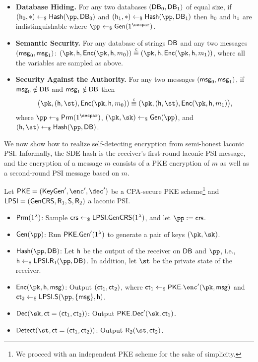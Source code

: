 \begin{definition}
\begin{itemize}
\item \textbf{Database Hiding.} For any two databases $({\mathsf{DB}}_0, {\mathsf{DB}}_1)$ of equal size, if $(\hsh_0, *) \pick \Hash(\pp, \DB_0)$ and $(\hsh_1, *) \pick \Hash(\pp, \DB_1)$ then ${\mathsf{h}}_0$ and ${\mathsf{h}}_1$ are indistinguishable where $\pp \pick \Gen(1^{\secpar})$.

\item \textbf{Semantic Security.} 
For any database of strings ${\mathsf{DB}}$ and any two messages $(\mathsf{msg}_0, \mathsf{msg}_1)$: $(\pk, \hsh, \Enc(\pk, \hsh, m_0)) \comp  (\pk, \hsh, \Enc(\pk, \hsh, m_1))$, where all the variables are sampled as above.

	
\item \textbf{Security Against the Authority.} For any two messages $(\mathsf{msg}_0, \mathsf{msg}_1)$, if $\mathsf{msg}_0 \notin {\mathsf{DB}}$ and $\mathsf{msg}_1 \notin {\mathsf{DB}}$ then  
\[\big(\pk, (\hsh, \st), \Enc(\pk, \hsh, m_0)) \comp  (\pk, (\hsh, \st), \Enc(\pk, \hsh, m_1)\big),\]
where $\pp \pick \Glo(1^\secpar)$, $(\pk, \sk) \pick \Gen(\pp)$, and $(\hsh, \st) \pick \Hash(\pp, \DB)$.

\end{itemize}
\end{definition}


We now show how to realize self-detecting encryption from  semi-honest laconic PSI. Informally, the SDE hash is the receiver's first-round laconic PSI message, and the encryption of a message $m$ consists of a PKE encryption of $m$ as well as a second-round PSI message based on $m$. 

\begin{construction}
 Let $\mathsf{PKE}= (\mathsf{KeyGen}', \enc', \dec')$ be a CPA-secure PKE scheme\footnote{We proceed with an independent PKE scheme for the sake of simplicity.} and $\mathsf{LPSI}=(\mathsf{GenCRS}, \mathsf{R}_1,  \mathsf{S}, \mathsf{R}_2)$ a laconic PSI. 
 \begin{itemize}
     \item {$\mathsf{Prm}(1^{\lambda})$:}  Sample $\mathsf{crs} \leftarrow_\$ \mathsf{LPSI}.\mathsf{GenCRS}(1^{\lambda})$, and let $\pp := \crs$.
     \item {$\Gen(\pp)$:}  Run $\mathsf{PKE}.\mathsf{Gen}'(1^{\lambda})$ to generate a pair of keys $(\pk, \sk)$. 
     \item {$\Hash(\pp, \DB)$:} Let ${\mathsf{h}}$ be the output of the receiver on ${\mathsf{DB}}$ and $\pp$, i.e., $\hsh \pick \mathsf{LPSI}.\Rs_1(\pp, \DB)$. In addition, let $\st$ be the private state of the receiver.
     \item {$\Enc(\pk, \hsh, \msg)$:}  Output $(\mathsf{ct}_1, \mathsf{ct}_2)$, where  $\ct_1 \pick \mathsf{PKE}.\enc'(\pk, \msg)$ and  $\ct_2 \pick\mathsf{LPSI}. \Ss(\pp,\{\msg\}, \hsh)$.
     \item {$\Dec(\sk, \ct = (\ct_1, \ct_2))$:}  Output $\mathsf{PKE}.\Dec'(\sk, \ct_1)$.
     \item {$\Det(\st, \ct = (\ct_1, \ct_2))$:} Output $\Rs_2(\st, \ct_2)$.
 \end{itemize}
\end{construction}



